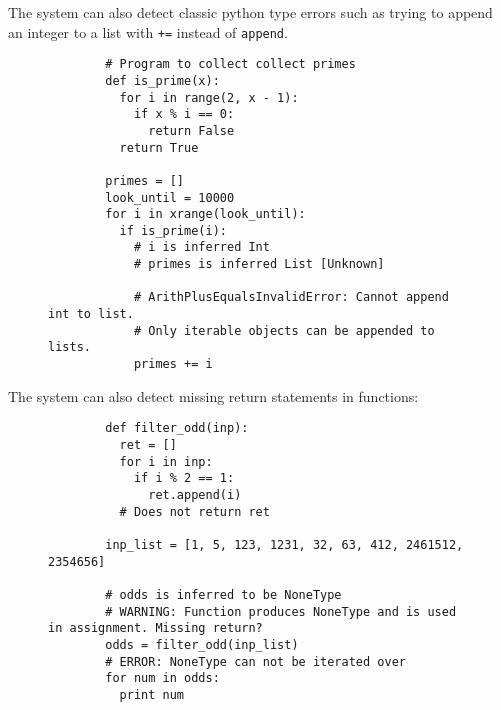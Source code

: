 \documentclass{article}[12pt]
\begin{document}
The system can also detect classic python type errors such as trying to append an integer to a list
with \texttt{+=} instead of \texttt{append}.
\begin{figure}
    \begin{verbatim}
        # Program to collect collect primes
        def is_prime(x):
          for i in range(2, x - 1):
            if x % i == 0:
              return False
          return True
        
        primes = []
        look_until = 10000
        for i in xrange(look_until):
          if is_prime(i):
            # i is inferred Int
            # primes is inferred List [Unknown]

            # ArithPlusEqualsInvalidError: Cannot append int to list. 
            # Only iterable objects can be appended to lists.
            primes += i
    \end{verbatim}
\end{figure}

The system can also detect missing return statements in functions:
\begin{figure}
    \begin{verbatim}
        def filter_odd(inp):
          ret = []
          for i in inp:
            if i % 2 == 1:
              ret.append(i)
          # Does not return ret

        inp_list = [1, 5, 123, 1231, 32, 63, 412, 2461512, 2354656]

        # odds is inferred to be NoneType
        # WARNING: Function produces NoneType and is used in assignment. Missing return?
        odds = filter_odd(inp_list)
        # ERROR: NoneType can not be iterated over
        for num in odds:
          print num
    
    \end{verbatim}
\end{figure}

       
\end{document}
